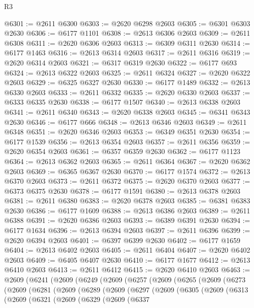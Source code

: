 \begin{lexlean}{R3}
\begin{coremodule}
@6301 := @2611 @6300
@6303 := @2620 @6298 @2603
@6305 := @6301 @6303 @2630
@6306 := @6177 @1101
@6308 := @2613 @6306 @2603
@6309 := @2611 @6308
@6311 := @2620 @6306 @2603
@6313 := @6309 @6311 @2630
@6314 := @6177 @1463
@6316 := @2613 @6314 @2603
@6317 := @2611 @6316
@6319 := @2620 @6314 @2603
@6321 := @6317 @6319 @2630
@6322 := @6177 @693
@6324 := @2613 @6322 @2603
@6325 := @2611 @6324
@6327 := @2620 @6322 @2603
@6329 := @6325 @6327 @2630
@6330 := @6177 @1489
@6332 := @2613 @6330 @2603
@6333 := @2611 @6332
@6335 := @2620 @6330 @2603
@6337 := @6333 @6335 @2630
@6338 := @6177 @1507
@6340 := @2613 @6338 @2603
@6341 := @2611 @6340
@6343 := @2620 @6338 @2603
@6345 := @6341 @6343 @2630
@6346 := @6177 @666
@6348 := @2613 @6346 @2603
@6349 := @2611 @6348
@6351 := @2620 @6346 @2603
@6353 := @6349 @6351 @2630
@6354 := @6177 @1539
@6356 := @2613 @6354 @2603
@6357 := @2611 @6356
@6359 := @2620 @6354 @2603
@6361 := @6357 @6359 @2630
@6362 := @6177 @1123
@6364 := @2613 @6362 @2603
@6365 := @2611 @6364
@6367 := @2620 @6362 @2603
@6369 := @6365 @6367 @2630
@6370 := @6177 @1574
@6372 := @2613 @6370 @2603
@6373 := @2611 @6372
@6375 := @2620 @6370 @2603
@6377 := @6373 @6375 @2630
@6378 := @6177 @1591
@6380 := @2613 @6378 @2603
@6381 := @2611 @6380
@6383 := @2620 @6378 @2603
@6385 := @6381 @6383 @2630
@6386 := @6177 @1609
@6388 := @2613 @6386 @2603
@6389 := @2611 @6388
@6391 := @2620 @6386 @2603
@6393 := @6389 @6391 @2630
@6394 := @6177 @1634
@6396 := @2613 @6394 @2603
@6397 := @2611 @6396
@6399 := @2620 @6394 @2603
@6401 := @6397 @6399 @2630
@6402 := @6177 @1659
@6404 := @2613 @6402 @2603
@6405 := @2611 @6404
@6407 := @2620 @6402 @2603
@6409 := @6405 @6407 @2630
@6410 := @6177 @1677
@6412 := @2613 @6410 @2603
@6413 := @2611 @6412
@6415 := @2620 @6410 @2603
@6463 := @2609
    (@6241
      (@2609
        (@6249
          (@2609
            (@6257
              (@2609
                (@6265
                  (@2609
                    (@6273
                      (@2609
                        (@6281
                          (@2609
                            (@6289
                              (@2609
                                (@6297
                                  (@2609
                                    (@6305
                                      (@2609
                                        (@6313
                                          (@2609
                                            (@6321
                                              (@2609
                                                (@6329
                                                  (@2609
                                                    (@6337

\end{coremodule}
\end{lexlean}
